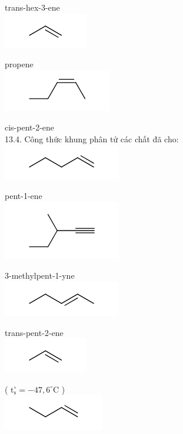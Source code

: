 \documentclass[10pt]{article}
\begin{document}
trans-hex-3-ene\\
\includegraphics{smile-70953a262a35a9741377e9e9921c122d6aeca391}

propene\\
\includegraphics{smile-6a1224db25158221053806ff68599a1908795a66}

cis-pent-2-ene\\
13.4. Công thức khung phân tử các chất đã cho:\\
\includegraphics{smile-5db86fc38e43057ca5d40d72f4078da99083ec65}

pent-1-ene\\
\includegraphics{smile-870a1adb5883b036bfd092ec760a4ed6c5059aba}

3-methylpent-1-yne\\
\includegraphics{smile-80914e69c179856ea2a218165ccf7f4b052a9bdf}

trans-pent-2-ene\\
\includegraphics{smile-8ad0b51618f6c71690567b181b49a7daea4a4104}

( $\mathrm{t}_{\mathrm{s}}^{\circ}=-47,6^{\circ} \mathrm{C}$ )\\
\includegraphics{smile-16234868fab4ee835b5757407315977999b89077}
\end{document}
